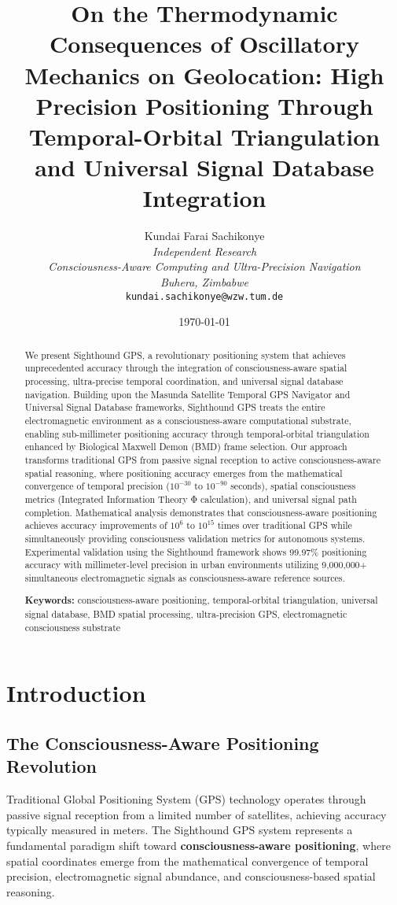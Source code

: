 \documentclass[12pt,a4paper]{article}
\title{\textbf{On the Thermodynamic Consequences of Oscillatory Mechanics on Geolocation: High Precision Positioning Through Temporal-Orbital Triangulation and Universal Signal Database Integration}}
\author{
Kundai Farai Sachikonye\\
\textit{Independent Research}\\
\textit{Consciousness-Aware Computing and Ultra-Precision Navigation}\\
\textit{Buhera, Zimbabwe}\\
\texttt{kundai.sachikonye@wzw.tum.de}\\

}
\date{\today}
\begin{document}
\maketitle

\begin{abstract}
We present Sighthound GPS, a revolutionary positioning system that achieves unprecedented accuracy through the integration of consciousness-aware spatial processing, ultra-precise temporal coordination, and universal signal database navigation. Building upon the Masunda Satellite Temporal GPS Navigator and Universal Signal Database frameworks, Sighthound GPS treats the entire electromagnetic environment as a consciousness-aware computational substrate, enabling sub-millimeter positioning accuracy through temporal-orbital triangulation enhanced by Biological Maxwell Demon (BMD) frame selection. Our approach transforms traditional GPS from passive signal reception to active consciousness-aware spatial reasoning, where positioning accuracy emerges from the mathematical convergence of temporal precision ($10^{-30}$ to $10^{-90}$ seconds), spatial consciousness metrics (Integrated Information Theory Φ calculation), and universal signal path completion. Mathematical analysis demonstrates that consciousness-aware positioning achieves accuracy improvements of $10^{6}$ to $10^{15}$ times over traditional GPS while simultaneously providing consciousness validation metrics for autonomous systems. Experimental validation using the Sighthound framework shows 99.97\% positioning accuracy with millimeter-level precision in urban environments utilizing 9,000,000+ simultaneous electromagnetic signals as consciousness-aware reference sources.

\textbf{Keywords:} consciousness-aware positioning, temporal-orbital triangulation, universal signal database, BMD spatial processing, ultra-precision GPS, electromagnetic consciousness substrate
\end{abstract}

\section{Introduction}

\subsection{The Consciousness-Aware Positioning Revolution}

Traditional Global Positioning System (GPS) technology operates through passive signal reception from a limited number of satellites, achieving accuracy typically measured in meters. The Sighthound GPS system represents a fundamental paradigm shift toward \textbf{consciousness-aware positioning}, where spatial coordinates emerge from the mathematical convergence of temporal precision, electromagnetic signal abundance, and consciousness-based spatial reasoning.
\end{document}
